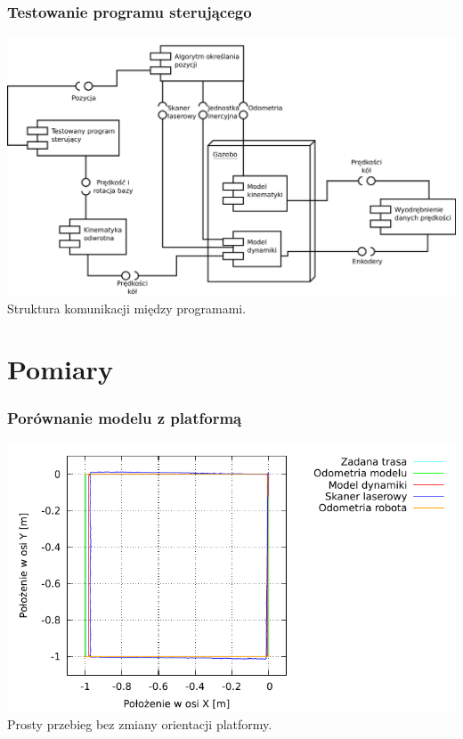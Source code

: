 \documentclass{beamer}
\begin{document}
	\begin{frame}
		\frametitle{Testowanie programu sterującego}
		\centering
		\includegraphics[width=\textwidth]{graphics/final.pdf} 
		Struktura komunikacji między programami.
	\end{frame}
	
	
	
	\section{Pomiary}
	\begin{frame}
		\frametitle{Porównanie modelu z platformą}
		\centering
		\includegraphics[width=\textwidth]{graphics/velmobil_xy.pdf} \\
		Prosty przebieg bez zmiany orientacji platformy.
	\end{frame}
	
\end{document}
